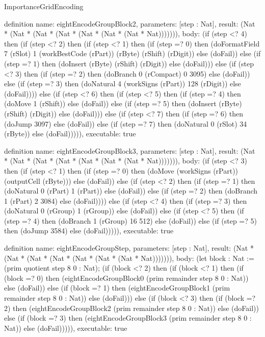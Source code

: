\begin{lexlean}{ImportanceGridEncoding}
\begin{semanticmodule}
definition{
  name: eightEncodeGroupBlock2,
  parameters: [step : Nat],
  result: (Nat * (Nat * (Nat * (Nat * (Nat * (Nat * (Nat * Nat))))))),
  body: (if (step <? 4) then
      (if (step <? 2) then
      (if (step <? 1) then
      (if (step =? 0) then (doFormatField 7 (rSlot) 1 (workBestCode (rPart)) (rByte) (rShift) (rDigit)) else (doFail)) else
      (if (step =? 1) then (doInsert (rByte) (rShift) (rDigit)) else (doFail))) else
      (if (step <? 3) then
      (if (step =? 2) then (doBranch 0 (rCompact) 0 3095) else (doFail)) else
      (if (step =? 3) then (doNatural 4 (workSigns (rPart)) 128 (rDigit)) else (doFail)))) else
      (if (step <? 6) then
      (if (step <? 5) then
      (if (step =? 4) then (doMove 1 (rShift)) else (doFail)) else
      (if (step =? 5) then (doInsert (rByte) (rShift) (rDigit)) else (doFail))) else
      (if (step <? 7) then
      (if (step =? 6) then (doJump 3097) else (doFail)) else
      (if (step =? 7) then (doNatural 0 (rSlot) 34 (rByte)) else (doFail))))),
  executable: true
}

definition{
  name: eightEncodeGroupBlock3,
  parameters: [step : Nat],
  result: (Nat * (Nat * (Nat * (Nat * (Nat * (Nat * (Nat * Nat))))))),
  body: (if (step <? 3) then
      (if (step <? 1) then
      (if (step =? 0) then (doMove (workSigns (rPart)) (outputCell (rByte))) else (doFail)) else
      (if (step <? 2) then
      (if (step =? 1) then (doNatural 0 (rPart) 1 (rPart)) else (doFail)) else
      (if (step =? 2) then (doBranch 1 (rPart) 2 3084) else (doFail)))) else
      (if (step <? 4) then
      (if (step =? 3) then (doNatural 0 (rGroup) 1 (rGroup)) else (doFail)) else
      (if (step <? 5) then
      (if (step =? 4) then (doBranch 1 (rGroup) 16 512) else (doFail)) else
      (if (step =? 5) then (doJump 3584) else (doFail))))),
  executable: true
}

definition{
  name: eightEncodeGroupStep,
  parameters: [step : Nat],
  result: (Nat * (Nat * (Nat * (Nat * (Nat * (Nat * (Nat * Nat))))))),
  body: (let block : Nat := (prim quotient step 8 0 : Nat); (if (block <? 2) then
      (if (block <? 1) then
      (if (block =? 0) then (eightEncodeGroupBlock0 (prim remainder step 8 0 : Nat)) else (doFail)) else
      (if (block =? 1) then (eightEncodeGroupBlock1 (prim remainder step 8 0 : Nat)) else (doFail))) else
      (if (block <? 3) then
      (if (block =? 2) then (eightEncodeGroupBlock2 (prim remainder step 8 0 : Nat)) else (doFail)) else
      (if (block =? 3) then (eightEncodeGroupBlock3 (prim remainder step 8 0 : Nat)) else (doFail))))),
  executable: true
}


\end{semanticmodule}
\end{lexlean}
